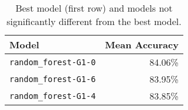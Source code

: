 \begin{table}[H]
\centering
\begin{tabularx}{0.48\textwidth}{|X|r|}
\hline
Model & Mean Accuracy \\
\hline
\texttt{random\_forest-G1-0} & 84.06\% \\
\texttt{random\_forest-G1-6} & 83.95\% \\
\texttt{random\_forest-G1-4} & 83.85\% \\
\hline
\end{tabularx}
\caption{Best model (first row) and models not significantly different from the best model.}
\label{tab:best_models}

\end{table}
